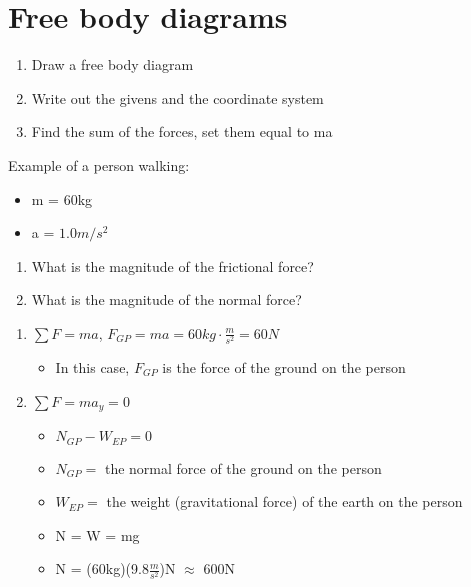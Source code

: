 \documentclass{article}
\begin{document}
\section{Free body diagrams}
\begin{enumerate}
    \item Draw a free body diagram
    \item Write out the givens and the coordinate system
    \item Find the sum of the forces, set them equal to ma
\end{enumerate}
\pagebreak
Example of a person walking:
\begin{itemize}
    \item m = 60kg
    \item a = $1.0m/s^2$
\end{itemize}
\begin{enumerate}
    \item What is the magnitude of the frictional force?
    \item What is the magnitude of the normal force?
\end{enumerate}
\begin{enumerate}
    \item $\sum F = ma$,  $F_{GP} = ma = 60kg\cdot \frac{m}{s^2} = 60N$
    \begin{itemize}
        \item In this case, $F_{GP}$ is the force of the ground on the person
    \end{itemize}
    \item $\sum F = ma_y = 0$
    \begin{itemize}
        \item $N_{GP} - W_{EP} = 0$
        \item $N_{GP} =$ the normal force of the ground on the person
        \item $W_{EP} =$ the weight (gravitational force) of the earth on the person
        \item N = W = mg 
        \item N = (60kg)(9.8$\frac{m}{s^2}$)N $\approx$ 600N
    \end{itemize}
\end{enumerate}
\end{document}
